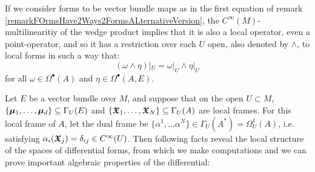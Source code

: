 \begin{remark}\label{remarkTheModuleWedgeWOrksWellLocally}
If we consider forms to be vector bundle maps as in the first equation of remark \ref{remarkFOrmsHave2Ways2FormsALternativeVersion}, the $C^\infty(M)$-multilinearitiy of the wedge product implies that it is also a local operator, even a point-operator, and so it has a restriction over each $U$ open, also denoted by $\wedge$, to local forms in such a way that:
\begin{equation*}
    (\omega \wedge \eta)|_U = \omega|_U \wedge \eta|_U
\end{equation*}
for all $\omega \in \Omega^\bullet(A)$ and $\eta \in \Omega^\bullet(A, E)$.
\end{remark}

Let $E$ be a vector bundle over $M$, and suppose that on the open $U \subset M$, $\{\bm{\mu}_1, \dots, \bm{\mu}_d\} \subseteq \Gamma_U(E)$ and $\{\bm{\mathfrak{X}}_1, \dots, \bm{\mathfrak{X}}_N\} \subseteq \Gamma_U(A)$ are local frames. 
For this local frame of $A$, let the dual frame be $\{\alpha^1, \dots \alpha^N\} \in \Gamma_U(A^*) = \Omega_U^1(A)$, i.e. satisfying $\alpha_i(\bm{\mathfrak{X}}_j) = \delta_{ij} \in C^\infty(U)$. Then following facts reveal the local structure of the spaces of differential forms, from which we make computations and we can prove important algebraic properties of the differential:

